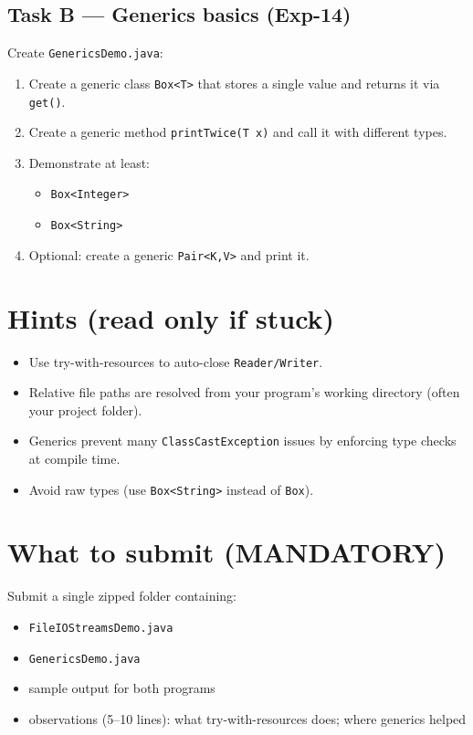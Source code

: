 \documentclass[11pt]{article}
\begin{document}
\subsection{Task B --- Generics basics (Exp-14)}
Create \texttt{GenericsDemo.java}:
\begin{enumerate}[leftmargin=*]
  \item Create a generic class \texttt{Box<T>} that stores a single value and returns it via \texttt{get()}.
  \item Create a generic method \texttt{printTwice(T x)} and call it with different types.
  \item Demonstrate at least:
  \begin{itemize}[leftmargin=*]
    \item \texttt{Box<Integer>}
    \item \texttt{Box<String>}
  \end{itemize}
  \item Optional: create a generic \texttt{Pair<K,V>} and print it.
\end{enumerate}

\section{Hints (read only if stuck)}
\begin{itemize}[leftmargin=*]
  \item Use try-with-resources to auto-close \texttt{Reader/Writer}.
  \item Relative file paths are resolved from your program's working directory (often your project folder).
  \item Generics prevent many \texttt{ClassCastException} issues by enforcing type checks at compile time.
  \item Avoid raw types (use \texttt{Box<String>} instead of \texttt{Box}).
\end{itemize}

\section{What to submit (MANDATORY)}
Submit a single zipped folder containing:
\begin{itemize}[leftmargin=*]
  \item \texttt{FileIOStreamsDemo.java}
  \item \texttt{GenericsDemo.java}
  \item sample output for both programs
  \item observations (5--10 lines): what try-with-resources does; where generics helped
\end{itemize}

\notesources{\OOPSUnitIIISources\ \OOPSUnitIVSources}
\end{document}
